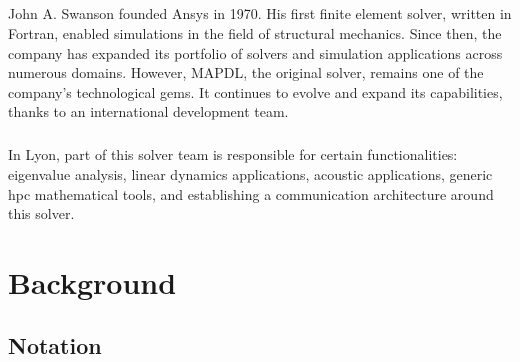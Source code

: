 \paragraph*{}
John A. Swanson founded Ansys in 1970. His first finite element solver, written in Fortran, enabled simulations in the field of structural mechanics. Since then, the company has expanded its portfolio of solvers and simulation applications across numerous domains. However, MAPDL, the original solver, remains one of the company's technological gems. It continues to evolve and expand its capabilities, thanks to an international development team.

\paragraph*{}
In Lyon, part of this solver team is responsible for certain functionalities: eigenvalue analysis, linear dynamics applications, acoustic applications, generic \acrshort{hpc} mathematical tools, and establishing a communication architecture around this solver.


\newpage

\chapter{Background}
\section{Notation}
